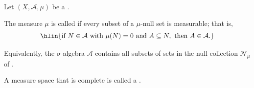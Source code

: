 \begin{definition} \label{definition:complete_measure_space}
Let $(X, \mathcal{A}, \mu)$ be a .

The measure $\mu$ is called  if every subset of a $\mu$-null set is measurable; that is,
$$\hlin{\text{if } N \in \mathcal{A} \text{ with } \mu(N) = 0 \text{ and } A \subseteq N, \text{ then } A \in \mathcal{A}.}$$

Equivalently, the $\sigma$-algebra $\mathcal{A}$ contains all subsets of sets in the null collection $\mathcal{N}_\mu$ of .

A measure space that is complete is called a .
\end{definition}
